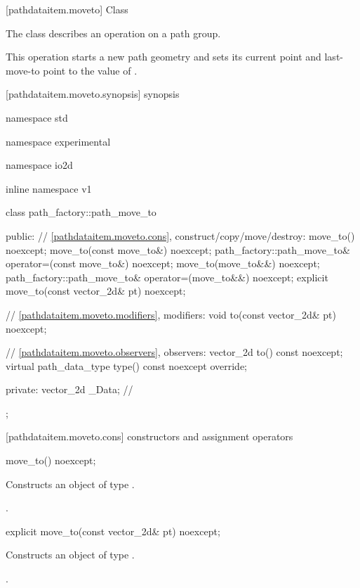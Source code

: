  [pathdataitem.moveto] {Class }

\pnum
{}
The class  describes an operation on a path group.

\pnum
This operation starts a new path geometry and sets its current point and last-move-to point to the value of .

 [pathdataitem.moveto.synopsis] { synopsis}

\begin{codeblock}
namespace std { namespace experimental { namespace io2d { inline namespace v1 {
  class path_factory::path_move_to {
  public:
    // \ref{pathdataitem.moveto.cons}, construct/copy/move/destroy:
    move_to() noexcept;
    move_to(const move_to&) noexcept;
    path_factory::path_move_to& operator=(const move_to&) noexcept;
    move_to(move_to&&) noexcept;
    path_factory::path_move_to& operator=(move_to&&) noexcept;
    explicit move_to(const vector_2d& pt) noexcept;

    // \ref{pathdataitem.moveto.modifiers}, modifiers:
    void to(const vector_2d& pt) noexcept;

    // \ref{pathdataitem.moveto.observers}, observers:
    vector_2d to() const noexcept;
    virtual path_data_type type() const noexcept override;
    
  private:
    vector_2d _Data; // \expos
  };
} } } }
\end{codeblock}

 [pathdataitem.moveto.cons] { constructors and assignment operators}

\begin{itemdecl}
    move_to() noexcept;
\end{itemdecl}
\begin{itemdescr}
	\pnum
	\effects
	Constructs an object of type .
	
	\pnum
	\postconditions
	.
\end{itemdescr}

\begin{itemdecl}
    explicit move_to(const vector_2d& pt) noexcept;
\end{itemdecl}
\begin{itemdescr}
	\pnum
	\effects
	Constructs an object of type .
	
	\pnum
	\postconditions
	.
\end{itemdescr}

